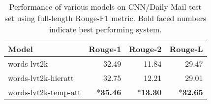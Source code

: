 \documentclass[11pt]{article}
\begin{document}
\begin{table}[]
\centering
{\small
\begin{tabular}{|l|r|r|r|}
\hline
Model & Rouge-1 & Rouge-2 & Rouge-L \\
\hline
words-lvt2k & 32.49 & 11.84 & 29.47 \\
words-lvt2k-hieratt & 32.75 & 12.21 & 29.01 \\
words-lvt2k-temp-att & *{\bf 35.46} & *{\bf 13.30} & *{\bf 32.65} \\
\hline
\end{tabular}
}
\caption{{\small Performance of various models on CNN/Daily Mail test set using full-length Rouge-F1 metric. Bold faced numbers indicate best performing system.}}
\label{tab:cnn}
\vspace{-0.2in}
\end{table}
\end{document}
